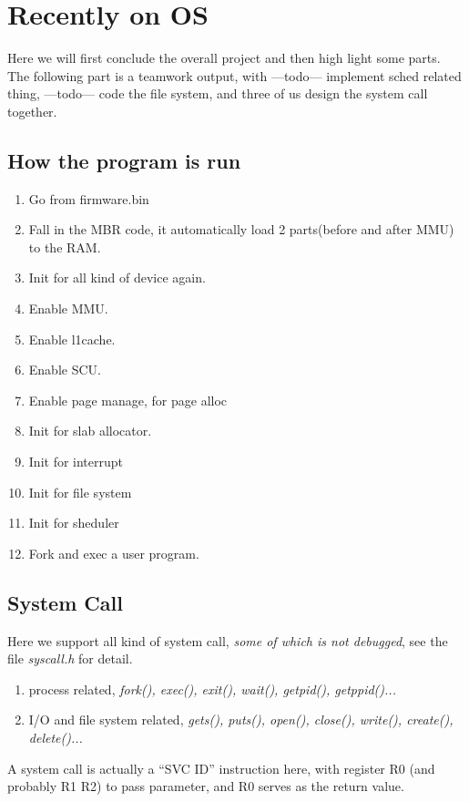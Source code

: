 \documentclass{article}
\begin{document}
\section{Recently on OS}

Here we will first conclude the overall project and then high light some parts. The following part is a teamwork output, with ---todo--- implement sched related thing, ---todo--- code the file system, and three of us design the system call together. 

\subsection{How the program is run}
\begin{enumerate}
	\item	Go from firmware.bin
	\item	Fall in the MBR code, it automatically load 2 parts(before and after MMU) to the RAM.
	\item Init for all kind of device again.
	\item Enable MMU.
	\item	Enable l1cache.
	\item	Enable SCU.
	\item	Enable page manage, for page alloc
	\item	Init for slab allocator.
	\item	Init for interrupt
	\item	Init for file system
	\item Init for sheduler
	\item	Fork and exec a user program.
\end{enumerate}

\subsection{System Call}
Here we support all kind of system call, \emph{some of which is not debugged}, see the file \emph{syscall.h} for detail.

\begin{enumerate}
	\item	process related, \emph{fork(), exec(), exit(), wait(), getpid(), getppid()...}
	\item I/O and file system related, \emph{gets(), puts(), open(), close(), write(), create(), delete()...}
\end{enumerate}

A system call is actually a ``SVC ID'' instruction here, with register R0 (and probably R1 R2) to pass parameter, and R0 serves as the return value.
\end{document}
